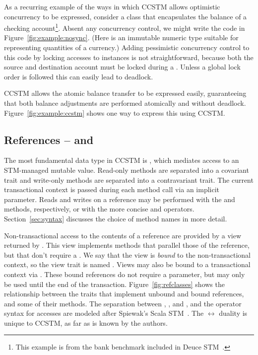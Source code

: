 As a recurring example of the ways in which CCSTM allows optimistic concurrency
to be expressed, consider a class that encapsulates the balance of a
checking account\footnote{This example is from the bank benchmark included
in Deuce STM~\cite{deucestm}.}.  Absent any concurrency control, we might
write the code in Figure~\ref{fig:example:nosync}.  (Here 
is an immutable numeric type suitable for representing quantities of
a currency.)  Adding pessimistic concurrency control to this code by
locking accesses to  instances is not straightforward,
because both the source and destination account must be locked during
a .  Unless a global lock order is followed this can
easily lead to deadlock.



CCSTM allows the atomic balance transfer to be expressed easily,
guaranteeing that both balance adjustments are performed atomically and
without deadlock.  Figure~\ref{fig:example:ccstm} shows one way to
express this using CCSTM.





\subsection{References --  and }

The most fundamental data type in CCSTM is , which mediates
access to an STM-managed mutable value.  Read-only methods are separated into a
covariant  trait and write-only methods are separated into a
contravariant  trait.  The current transactional context is passed
during
each method call via an implicit parameter.  Reads and writes on a
reference may be performed with the  and  methods,
respectively, or with the more concise  and \code{:=}
operators.  Section~\ref{sec:syntax} discusses
the choice of method names in more detail.

Non-transactional access to the contents of a reference are provided by a view
returned by .  This view implements methods that parallel those of
the reference, but that don't require a .  We say that the view
is \textit{bound} to the non-transactional context, so the view trait is
named .  Views may also be bound to a transactional context
via .  These bound references do not require a 
parameter, but may only be used until the end of the transaction.
Figure~\ref{fig:refclasses} shows the
 relationship between the traits that implement unbound
and bound references, and some of their methods.  The separation between
, , and , and the operator syntax for
accesses are modeled after Spiewak's Scala STM~\cite{github:spiewak}.
The  $ \leftrightarrow $  duality is unique
to CCSTM, as far as is known by the authors.

